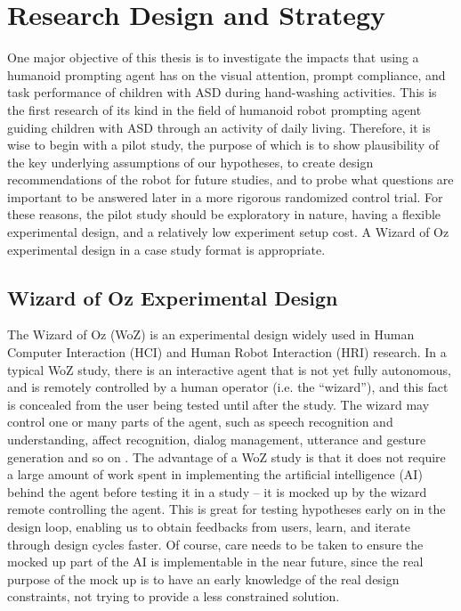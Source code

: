 \section{Research Design and Strategy}
One major objective of this thesis is to investigate the impacts that using a humanoid prompting agent has on the visual attention, prompt compliance, and task performance of children with ASD during hand-washing activities.  This is the first research of its kind in the field of humanoid robot prompting agent guiding children with ASD through an activity of daily living.  Therefore, it is wise to begin with a pilot study, the purpose of which is to show plausibility of the key underlying assumptions of our hypotheses, to create design recommendations of the robot for future studies, and to probe what questions are important to be answered later in a more rigorous randomized control trial.  For these reasons, the pilot study should be exploratory in nature, having a flexible experimental design, and a relatively low experiment setup cost.  A Wizard of Oz experimental design in a case study format is appropriate.

\subsection{Wizard of Oz Experimental Design}
The Wizard of Oz (WoZ) is an experimental design widely used in Human Computer Interaction (HCI) and Human Robot Interaction (HRI) research.  In a typical WoZ study, there is an interactive agent that is not yet fully autonomous, and is remotely controlled by a human operator (i.e. the ``wizard''), and this fact is concealed from the user being tested until after the study.  The wizard may control one or many parts of the agent, such as speech recognition and understanding, affect recognition, dialog management, utterance and gesture generation and so on \cite{bhargava2013demonstration}.  The advantage of a WoZ study is that it does not require a large amount of work spent in implementing the artificial intelligence (AI) behind the agent before testing it in a study -- it is mocked up by the wizard remote controlling the agent.  This is great for testing hypotheses early on in the design loop, enabling us to obtain feedbacks from users, learn, and iterate through design cycles faster.  Of course, care needs to be taken to ensure the mocked up part of the AI is implementable in the near future, since the real purpose of the mock up is to have an early knowledge of the real design constraints, not trying to provide a less constrained solution.


